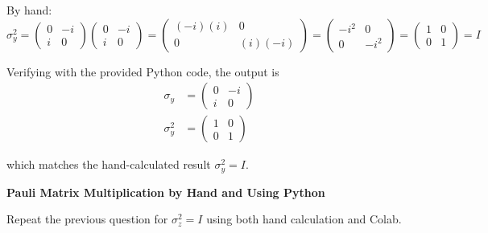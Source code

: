 \documentclass[a4paper, 10pt]{article}
\begin{document}
\begin{solution}
	By hand:
	\[
		\sigma_y^2 = \begin{pmatrix}
			0 & -i \\
			i & 0
		\end{pmatrix}\begin{pmatrix}
			0 & -i \\
			i & 0
		\end{pmatrix} = \begin{pmatrix}
			(-i)(i) & 0       \\
			0       & (i)(-i)
		\end{pmatrix} = \begin{pmatrix}
			-i^2 & 0    \\
			0    & -i^2
		\end{pmatrix} = \begin{pmatrix}
			1 & 0 \\
			0 & 1
		\end{pmatrix} = I
	\]

	Verifying with the provided Python code, the output is
	\begin{align*}
		\sigma_y   & = \begin{pmatrix}
			               0 & -i \\
			               i & 0
		               \end{pmatrix} \\
		\sigma_y^2 & = \begin{pmatrix}
			               1 & 0 \\
			               0 & 1
		               \end{pmatrix}
	\end{align*}

	which matches the hand-calculated result \( \sigma_y^2 = I \).
\end{solution}

\newpage

\begin{problem}
\textbf{Pauli Matrix Multiplication by Hand and Using Python}
\par Repeat the previous question for \( \sigma_z^2 = I \) using both hand calculation and Colab.
\end{problem}
\end{document}
